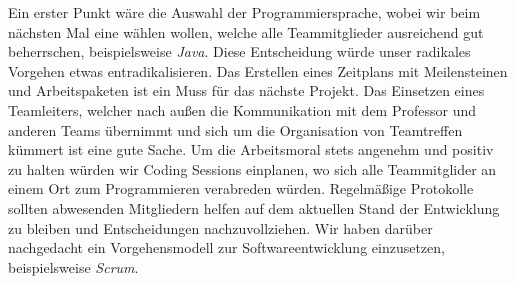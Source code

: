 Ein erster Punkt wäre die Auswahl der Programmiersprache, wobei wir beim nächsten Mal eine wählen wollen, welche alle Teammitglieder ausreichend gut beherrschen, beispielsweise \emph{Java}. Diese Entscheidung würde unser radikales Vorgehen etwas entradikalisieren. Das Erstellen eines Zeitplans mit Meilensteinen und Arbeitspaketen ist ein Muss für das nächste Projekt.
Das Einsetzen eines Teamleiters, welcher nach außen die Kommunikation mit dem Professor und anderen Teams übernimmt und sich um die Organisation von Teamtreffen kümmert ist eine gute Sache. Um die Arbeitsmoral stets angenehm und positiv zu halten würden wir Coding Sessions einplanen, wo sich alle Teammitglider an einem Ort zum Programmieren verabreden würden. Regelmäßige Protokolle sollten abwesenden Mitgliedern helfen auf dem aktuellen Stand der Entwicklung zu bleiben und Entscheidungen nachzuvollziehen.
Wir haben darüber nachgedacht ein Vorgehensmodell zur Softwareentwicklung einzusetzen, beispielsweise \emph{Scrum}.